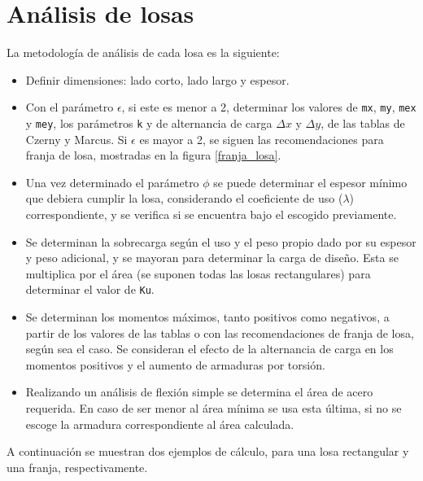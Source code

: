 \newpage 
\section{Análisis de losas}

    La metodología de análisis de cada losa es la siguiente:
        \begin{itemize}
            \item Definir dimensiones: lado corto, lado largo y espesor.
            \item Con el parámetro $\epsilon$, si este es menor a 2, determinar los valores de \texttt{mx}, \texttt{my}, \texttt{mex} y \texttt{mey}, los parámetros \texttt{k} y de alternancia de carga $\Delta x$ y $\Delta y$, de las tablas de Czerny y Marcus. Si $\epsilon$ es mayor a 2, se siguen las recomendaciones para franja de losa, mostradas en la figura \ref{franja_losa}.
            \item Una vez determinado el parámetro $\phi$ se puede determinar el espesor mínimo que debiera cumplir la losa, considerando el coeficiente de uso ($\lambda$) correspondiente, y se verifica si se encuentra bajo el escogido previamente. 
            \item Se determinan la sobrecarga según el uso y el peso propio dado por su espesor y peso adicional, y se mayoran para determinar la carga de diseño. Esta se multiplica por el área (se suponen todas las losas rectangulares) para determinar el valor de \texttt{Ku}.
            \item Se determinan los momentos máximos, tanto positivos como negativos, a partir de los valores de las tablas o con las recomendaciones de franja de losa, según sea el caso.
            Se consideran el efecto de la alternancia de carga en los momentos positivos y el aumento de armaduras por torsión.
            \item Realizando un análisis de flexión simple se determina el área de acero requerida. En caso de ser menor al área mínima se usa esta última, si no se escoge la armadura correspondiente al área calculada.
        \end{itemize}
        
    
    \newpage
    A continuación se muestran dos ejemplos de cálculo, para una losa rectangular y una franja, respectivamente. 
    
